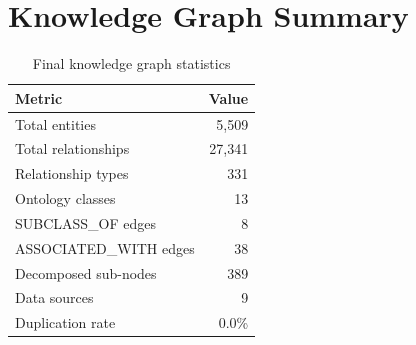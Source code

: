 \documentclass[11pt]{article}
\begin{document}
\section{Knowledge Graph Summary}

\begin{table}[h]
\centering
\caption{Final knowledge graph statistics}
\begin{tabular}{lr}
\toprule
\textbf{Metric} & \textbf{Value} \\
\midrule
Total entities & 5,509 \\
Total relationships & 27,341 \\
Relationship types & 331 \\
Ontology classes & 13 \\
SUBCLASS\_OF edges & 8 \\
ASSOCIATED\_WITH edges & 38 \\
Decomposed sub-nodes & 389 \\
Data sources & 9 \\
Duplication rate & 0.0\% \\
\bottomrule
\end{tabular}
\end{table}
\end{document}
